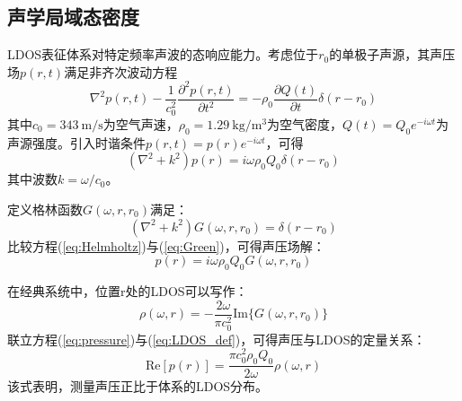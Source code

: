 \subsection{声学局域态密度}
\label{sec:LDOS}
LDOS表征体系对特定频率声波的态响应能力\cite{landi2018acoustic}。考虑位于$r_0$的单极子声源，其声压场$p(r,t)$满足非齐次波动方程
\begin{equation}
    \nabla^2 p(r,t) - \frac{1}{c_0^2} \frac{\partial^2 p(r,t)}{\partial t^2} = -\rho_0 \frac{\partial Q(t)}{\partial t} \delta(r - r_0)
\end{equation}
其中$c_0=343\ \mathrm{m/s}$为空气声速，$\rho_0=1.29\ \mathrm{kg/m^3}$为空气密度，$Q(t)=Q_0 e^{-i\omega t}$为声源强度。引入时谐条件$p(r,t)=p(r)e^{-i\omega t}$，可得
\begin{equation}
    (\nabla^2 + k^2)p(r) = i\omega\rho_0 Q_0 \delta(r - r_0)
    \label{eq:Helmholtz}
\end{equation}
其中波数$k=\omega/c_0$。

定义格林函数$G(\omega,r,r_0)$满足：
\begin{equation}
    (\nabla^2 + k^2)G(\omega,r,r_0) = \delta(r - r_0)
    \label{eq:Green}
\end{equation}
比较方程(\ref{eq:Helmholtz})与(\ref{eq:Green})，可得声压场解：
\begin{equation}
    p(r) = i\omega\rho_0 Q_0 G(\omega,r,r_0)
    \label{eq:pressure}
\end{equation}

在经典系统中，位置r处的LDOS可以写作\cite{sheng2007introduction}：
\begin{equation}
    \rho(\omega,r) = -\frac{2\omega}{\pi c_0^2} \mathrm{Im}\{G(\omega,r,r_0)\}
    \label{eq:LDOS_def}
\end{equation}
联立方程(\ref{eq:pressure})与(\ref{eq:LDOS_def})，可得声压与LDOS的定量关系：
\begin{equation}
    \mathrm{Re}[p(r)] = \frac{\pi c_0^2 \rho_0 Q_0}{2\omega} \rho(\omega,r)
    \label{eq:measurement}
\end{equation}
该式表明，测量声压正比于体系的LDOS分布。


